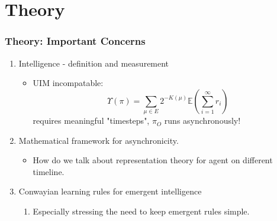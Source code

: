 \documentclass{beamer}
\begin{document}
\section{Theory}
    \begin{frame}
        \frametitle{Theory: Important Concerns}
        	\begin{enumerate}
	        	\item Intelligence - definition and measurement
                \begin{itemize}
					\item UIM incompatable:
                    \begin{equation}
                  \Upsilon(\pi) = \sum_{\mu \in E}2^{-K(\mu)}  \mathbb{E}\left(\sum_{i=1}^\infty r_i \right) 
                  \end{equation}
                  requires meaningful "timesteps", $\pi_O$ runs asynchronously!
                \end{itemize}
                \item Mathematical framework for asynchronicity.
                \begin{itemize}
                \item How do we talk about representation theory for agent on different timeline.
                \end{itemize}
                \item Conwayian learning rules for emergent intelligence
                \begin{enumerate}
                	\item Especially stressing the need to keep emergent rules simple.
                \end{enumerate}
            \end{enumerate}
    \end{frame}



 
\end{document}
